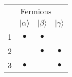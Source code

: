 \documentclass[11pt]{article}
\begin{document}
\begin{table}[h]
\renewcommand{\arraystretch}{1.2}
\begin{tabular}{c|ccc}
\multicolumn{4}{c}{Fermions} \\
&  $|\alpha\rangle$ & $|\beta\rangle$ & $|\gamma\rangle$ \\
\hline\hline
1 &  $\bullet$ & $\bullet$ & \\  \hline
2 & & $\bullet$ &  $\bullet$ \\  \hline
3 &  $\bullet$ & & $\bullet$ \\  
\hline\hline
\end{tabular}
\end{table}
\end{document}
